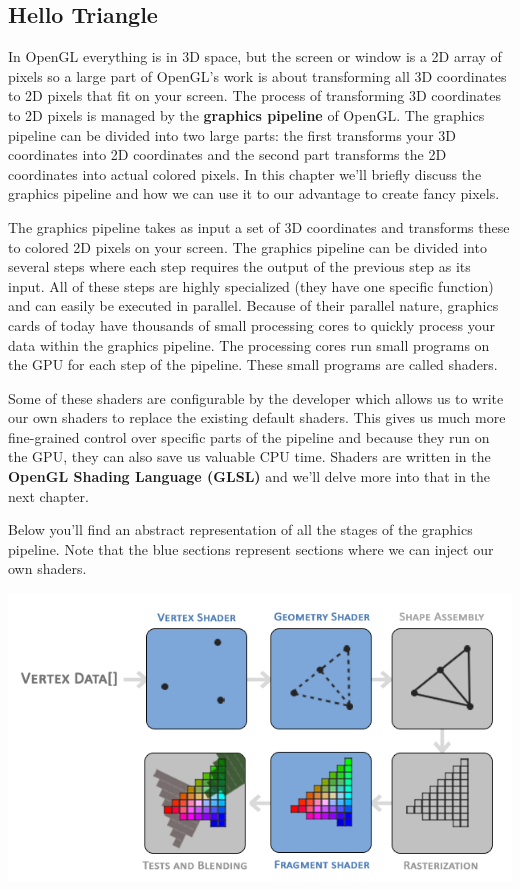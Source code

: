 \subsection{Hello Triangle}

In OpenGL everything is in 3D space, but the screen or window is a 2D array of pixels so a large part of OpenGL's work is about transforming all 3D coordinates to 2D pixels that fit on your screen. The process of transforming 3D coordinates to 2D pixels is managed by the \textbf{graphics pipeline} of OpenGL. The graphics pipeline can be divided into two large parts: the first transforms your 3D coordinates into 2D coordinates and the second part transforms the 2D coordinates into actual colored pixels. In this chapter we'll briefly discuss the graphics pipeline and how we can use it to our advantage to create fancy pixels.

The graphics pipeline takes as input a set of 3D coordinates and transforms these to colored 2D pixels on your screen. The graphics pipeline can be divided into several steps where each step requires the output of the previous step as its input. All of these steps are highly specialized (they have one specific function) and can easily be executed in parallel. Because of their parallel nature, graphics cards of today have thousands of small processing cores to quickly process your data within the graphics pipeline. The processing cores run small programs on the GPU for each step of the pipeline. These small programs are called shaders.

Some of these shaders are configurable by the developer which allows us to write our own shaders to replace the existing default shaders. This gives us much more fine-grained control over specific parts of the pipeline and because they run on the GPU, they can also save us valuable CPU time. Shaders are written in the \textbf{OpenGL Shading Language (GLSL)} and we'll delve more into that in the next chapter.

Below you'll find an abstract representation of all the stages of the graphics pipeline. Note that the blue sections represent sections where we can inject our own shaders.

\includegraphics[scale = 2.5]{pics/pipeline.png}

